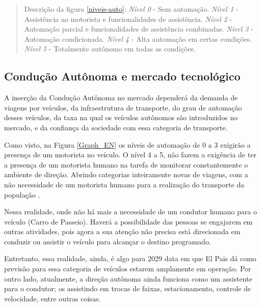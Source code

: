 \begin{quote}
Descrição da figura \ref{niveis-auto}:  \textit{Nível 0} - Sem automação.  \textit{Nível 1} - Assistência ao motorista e funcionalidades de assistência.  \textit{Nível 2} - Automação parcial e funcionalidades de assistência combinadas.  \textit{Nível 3} - Automação condicionada.  \textit{Nível 4} - Alta automação em certas condições.  \textit{Nível 5} - Totalmente autônomo em todas as condições. 
\end{quote}



\subsection{Condução Autônoma e mercado tecnológico}

A inserção da Condução Autônoma no mercado dependerá da demanda de viagens por veículos, da infraestrutura de transporte, do grau de automação desses veículos, da taxa na qual os veículos autônomos são introduzidos no mercado, e da confiança da sociedade com essa categoria de transporte. 

Como visto, na Figura \ref{Graph_EN} os níveis de automação de 0 a 3 exigirão a presença de um motorista no veículo. O nível 4 a 5, não fazem a exigência de ter a presença de um motorista humano na tarefa de monitorar constantemente o ambiente de direção. 
Abrindo categorias inteiramente novas de viagens, com a não necessidade de um motorista humano para a realização do transporte da população \cite{notif}.

Nessa realidade, onde não há mais a necessidade de um condutor humano para o veículo (Carro de Passeio). Haverá a possibilidade das pessoas se engajarem em outras atividades, pois agora a sua atenção não precisa está direcionada em conduzir ou assistir o veículo para alcançar o destino programado. 


Entretanto, essa realidade, ainda, é algo para 2029 \cite{elpais} data em que El Pais dá como previsão para essa categoria de veículos estarem amplamente em operação. Por outro lado, atualmente, a direção autônoma ainda funciona como um assistente para o condutor; os assistindo em trocas de faixas, estacionamento, controle de velocidade, entre outras coisas. 

